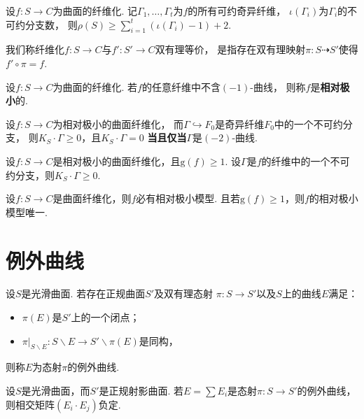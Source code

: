 \begin{lemma}
    设$f \colon S \to C$为曲面的纤维化. 
    记$\Gamma_{1},\dots,\Gamma_{t}$为$f$的所有可约奇异纤维，
    $\iota(\Gamma_{i})$为$\Gamma_{i}$的不可约分支数，
    则$\rho(S) \geq \sum_{i=1}^{t}(\iota(\Gamma_{i})-1) + 2$.
\end{lemma}

我们称纤维化$f \colon S \to C$与$f' \colon S' \to C$双有理等价，
是指存在双有理映射$\pi \colon S \dashrightarrow S'$使得$f' \circ \pi = f$.
\begin{definition}
    设$f \colon S \to C$为曲面的纤维化. 若$f$的任意纤维中不含$(-1)$-曲线，
    则称$f$是\textbf{相对极小}的.
\end{definition}

\begin{lemma}
    设$f \colon S \to C$为相对极小的曲面纤维化，
    而$\Gamma \hookrightarrow F_{0}$是奇异纤维$F_{0}$中的一个不可约分支，
    则$K_{S} \cdot \Gamma \geq 0$，且$K_{S} \cdot \Gamma = 0$
    \textbf{当且仅当}$\Gamma$是$(-2)$-曲线.
\end{lemma}

\begin{lemma}
    设$f \colon S \to C$是相对极小的曲面纤维化，且$\mathrm{g}(f) \geq 1$.
    设$\Gamma$是$f$的纤维中的一个不可约分支，则$K_{S} \cdot \Gamma \geq 0$.
\end{lemma}

\begin{theorem}
    设$f \colon S \to C$是曲面纤维化，则$f$必有相对极小模型. 
    且若$\mathrm{g}(f) \geq 1$，则$f$的相对极小模型唯一.
\end{theorem}

\section{例外曲线}
\begin{definition}
    设$S$是光滑曲面. 若存在正规曲面$S'$及双有理态射
    $\pi \colon S \to S'$以及$S$上的曲线$E$满足：
    \begin{itemize}
        \item[(1)] $\pi(E)$是$S'$上的一个闭点；
        \item[(2)] $\pi|_{S\backslash E} \colon 
        S \backslash E \to S'\backslash \pi(E)$是同构，
    \end{itemize}
    则称$E$为态射$\pi$的例外曲线.
\end{definition}

\begin{lemma}
    设$S$是光滑曲面，而$S'$是正规射影曲面. 
    若$E = \sum E_{i}$是态射$\pi \colon S \to S'$的例外曲线，
    则相交矩阵$(E_{i} \cdot E_{j})$负定.
\end{lemma}


